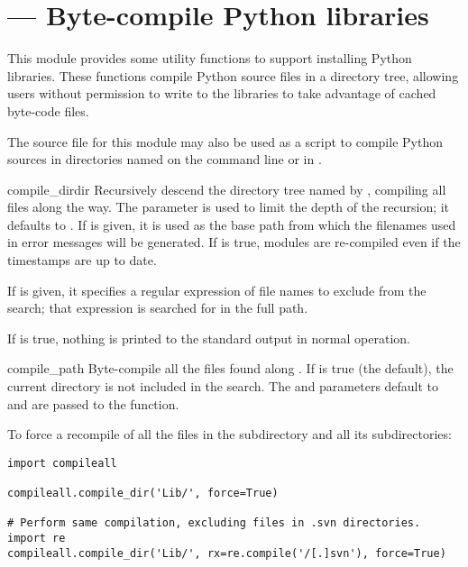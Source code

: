 \section{ ---
         Byte-compile Python libraries}



This module provides some utility functions to support installing
Python libraries.  These functions compile Python source files in a
directory tree, allowing users without permission to write to the
libraries to take advantage of cached byte-code files.

The source file for this module may also be used as a script to
compile Python sources in directories named on the command line or in
.


\begin{funcdesc}{compile_dir}{dir}
  Recursively descend the directory tree named by , compiling
  all  files along the way.  The  parameter
  is used to limit the depth of the recursion; it defaults to
  .  If  is given, it is used as the base path from 
  which the filenames used in error messages will be generated.  If
   is true, modules are re-compiled even if the timestamps
  are up to date. 

  If  is given, it specifies a regular expression of file
  names to exclude from the search; that expression is searched for in
  the full path.

  If  is true, nothing is printed to the standard output
  in normal operation.
\end{funcdesc}

\begin{funcdesc}{compile_path}{}
  Byte-compile all the  files found along .
  If  is true (the default), the current directory is
  not included in the search.  The  and
   parameters default to  and are passed to the
   function.
\end{funcdesc}

To force a recompile of all the  files in the 
subdirectory and all its subdirectories:

\begin{verbatim}
import compileall

compileall.compile_dir('Lib/', force=True)

# Perform same compilation, excluding files in .svn directories.
import re
compileall.compile_dir('Lib/', rx=re.compile('/[.]svn'), force=True)
\end{verbatim}


\begin{seealso}
\end{seealso}
